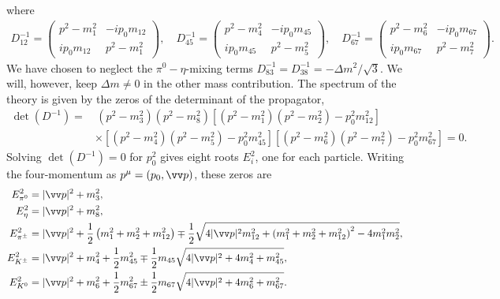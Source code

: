 %
where
%
\begin{align}
    D_{12}^{-1}
    = 
    \begin{pmatrix}
        p^2 - m_1^2 & -ip_0 m_{12} \\
        ip_0 m_{12} & p^2 - m_1^2           
    \end{pmatrix}, \quad
    D_{45}^{-1}
    = 
    \begin{pmatrix}
        p^2 - m_4^2 & -ip_0 m_{45} \\
        ip_0 m_{45} & p^2 - m_5^2           
    \end{pmatrix}, \quad
    D_{67}^{-1}
    = 
    \begin{pmatrix}
        p^2 - m_6^2 & -ip_0 m_{ 67} \\
        ip_0 m_{67} & p^2 - m_7^2           
    \end{pmatrix}.
\end{align}
%
We have chosen to neglect the $\pi^0 - \eta$-mixing terms $D_{83}^{-1} = D_{38}^{-1} = - \Delta m^2 / \sqrt{3}$.
We will, however, keep $\Delta m \neq 0$ in the other mass contribution.
The spectrum of the theory is given by the zeros of the determinant of the propagator,
\begin{align}
    \nonumber
    \det\left(D^{-1}\right)
    =&\,
    (p^2 - m_3^2)(p^2 - m_8^2)
    \left[ (p^2 - m_1^2)(p^2 - m_2^2) - p_0^2m_{12}^2  \right]\\
    &\times
    \left[ (p^2 - m_4^2)(p^2 - m_5^2) -  p_0^2m_{45}^2  \right]
    \left[ (p^2 - m_6^2)(p^2 - m_7^2) -  p_0^2m_{67}^2  \right]
    = 0.
\end{align}
%
Solving $\det(D^{-1}) = 0$ for $p_0^2$ gives eight roots $E_i^2$, one for each particle.
Writing the four-momentum as $p^\mu = (p_0, \vv p)$, these zeros are
%
\begingroup
\allowdisplaybreaks
\begin{align}
    \label{E1}
    E_{\pi^0}^2 &= |\vv p |^2 + m_3^2, \\
    \label{E2}
    E_\eta^2 &= |\vv p |^2 + m_8^2, \\
    E_\pipm^2
    & = |\vv p|^2 +
    \frac{1}{2}
    \left(
        m_1^2 + m_2^2 + m_{12}^2 
    \right)
    \mp
    \frac{1}{2}
    \sqrt{
        4|\vv p|^2m_{12}^2 
        +
        \left(
            m_1^2 + m_2^2 + m_{12}^2
        \right)^2
        - 4 m_1^2 m_2^2
    }, \\
    \label{E3}
    E_\Kpm^2
    & = |\vv p|^2 + m_4^2 + \frac{1}{2} m_{45}^2 
    \mp
    \frac{1}{2} m_{45} \sqrt{4|\vv p|^2 + 4 m_4^2 + m_{45}^2},\\
    \label{E4}
    E_\Ko^2
    &= |\vv p|^2 + m_6^2 + \frac{1}{2} m_{67}^2 
    \pm
    \frac{1}{2} m_{67} \sqrt{4|\vv p|^2 + 4 m_6^2 + m_{67}^2}.
\end{align}
